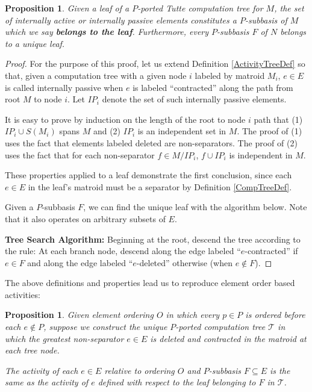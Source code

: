 \documentclass[12pt,leqno]{amsart}
\newtheorem{prop}[lem]{Proposition}
\theoremstyle{remark}
\begin{document}
\begin{prop}
Given a leaf of a $P$-ported Tutte computation tree for $M$,
the set of internally active or internally passive elements 
constitutes a 
$P$-subbasis of $M$ which we say 
\textbf{belongs to the leaf}.  
Furthermore, every $P$-subbasis $F$ of $N$ belongs to a unique leaf.
\end{prop}

\begin{proof}
For the purpose of this proof, let us extend Definition \ref{ActivityTreeDef}
so that, given a computation tree with a given node $i$ 
labeled by matroid $M_i$,
$e\in E$ is called internally passive when $e$ is labeled 
``contracted'' along the path from root $M$ to
node $i$.  Let $IP_i$ denote the set of such internally passive 
elements.

It is easy to prove by induction on the length of the root to node $i$ path
that
(1) $IP_i\cup S(M_i)$ spans $M$ and 
(2) $IP_i$ is an independent set in $M$.  The proof
of (1) uses the fact that elements labeled deleted are non-separators.  The
proof of (2) uses the fact that for each non-separator 
$f\in M/IP_i$, $f\cup IP_i$ is independent in $M$.

These properties applied to a leaf demonstrate the first conclusion,
since each $e\in E$ in the leaf's matroid must be a separator by Definition 
\ref{CompTreeDef}.

Given a $P$-subbasis $F$, we can find the unique leaf with the
algorithm below.  Note that it also operates on arbitrary subsets of $E$.

\textbf{Tree Search Algorithm:} Beginning
at the root, descend the tree according to the rule: At each branch node,
descend along the edge labeled ``$e$-contracted'' if $e\in F$ and along
the edge labeled ``$e$-deleted'' otherwise (when $e\not\in F$).
\end{proof}

The above definitions and properties lead us to 
reproduce element order based activities:
\begin{prop}
Given element ordering $O$ in which every $p\in P$ is ordered
before each $e\not\in P$, suppose we construct the unique $P$-ported
computation tree $\mathcal{T}$ in which the greatest non-separator $e\in E$ is
deleted and contracted in the matroid at each tree node.

The activity of each $e\in E$ relative to ordering $O$ and
$P$-subbasis $F\subseteq E$ is the same as the activity
of $e$ defined with respect to the leaf 
belonging to $F$ in $\mathcal{T}$.
\end{prop}
\end{document}

